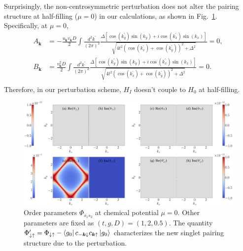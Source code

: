 \documentclass[11pt]{article}
\begin{document}
Surprisingly, the non-centrosymmetric perturbation does not alter the pairing structure at half-filling
($\mu = 0$) in our calculations, as shown in Fig.~\ref{fig:mu=0}. Specifically, at $\mu = 0$,
\begin{equation}
    \begin{aligned}
        A_{\bm k} &= -\frac{u_{\bm k}v_{\bm k} D}{2}\int \frac{d^2 k^\prime}{(2\pi)^2}
        \frac{\Delta[\cos(k_y^\prime)\sin(k_y) + i\cos(k_x^\prime)\sin(k_x)]}
        {\sqrt{4t^2(\cos(k_x^\prime)+\cos(k_y^\prime))^2+\Delta^2}} = 0,\\
        B_{\bm k} &= \frac{v_{\bm k}^2 D}{2}\int \frac{d^2 k^\prime}{(2\pi)^2}
        \frac{\Delta[\cos(k_y^\prime)\sin(k_y) + i\cos(k_x^\prime)\sin(k_x)]}
        {\sqrt{4t^2(\cos(k_x^\prime)+\cos(k_y^\prime))^2+\Delta^2}} = 0.\\
    \end{aligned}
\end{equation}
Therefore, in our perturbation scheme, $H_I$ doesn't couple to $H_{0}$ at half-filling.



\begin{figure}[htb]
  \centering
  \includegraphics[width=\linewidth]{../plot/order_0.0_2.0_0.5.pdf}
  \caption{Order parameters $\Phi_{s_1 s_2}$ at chemical potential $\mu = 0$. Other parameters are
  fixed as $(t, g, D) = (1, 2, 0.5)$. The quantity $\Phi^\prime_{\downarrow \uparrow} =
  \Phi_{\downarrow \uparrow} - \left \langle g_0 \right \rvert c_{-\bm k \downarrow} c_{\bm k \uparrow} \left \rvert g_0 \right \rangle$
  characterizes the new singlet pairing structure due to the perturbation.}
  \label{fig:mu=0}
\end{figure}
\end{document}
